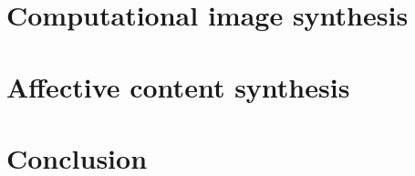 \documentclass{article}
\begin{document}
\section{Computational image synthesis}

\section{Affective content synthesis}

\section{Conclusion}



\end{document}
